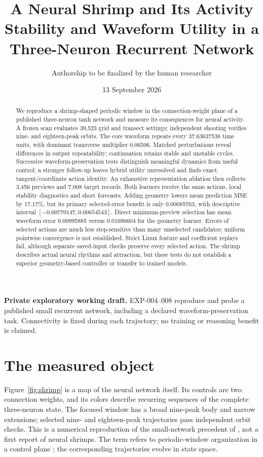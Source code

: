 \documentclass[11pt,letterpaper]{article}
\title{A Neural Shrimp and Its Activity\\
\large Stability and Waveform Utility in a Three-Neuron Recurrent Network}
\author{Authorship to be finalized by the human researcher}
\date{13 September 2026}
\begin{document}
\maketitle
\noindent\textbf{Private exploratory working draft.} EXP-004--008 reproduce and probe a published small recurrent network, including a declared waveform-preservation task. Connectivity is fixed during each trajectory; no training or reasoning benefit is claimed.

\begin{abstract}
We reproduce a shrimp-shaped periodic window in the connection-weight plane of a published three-neuron tanh network and measure its consequences for neural activity. A frozen scan evaluates 39,523 grid and transect settings; independent shooting verifies nine- and eighteen-peak orbits. The core waveform repeats every 37.63637538 time units, with dominant transverse multiplier 0.06506. Matched perturbations reveal differences in output repeatability; continuation retains stable and unstable cycles. Successive waveform-preservation tests distinguish meaningful dynamics from useful control: a stronger follow-up leaves hybrid utility unresolved and finds exact tangent/coordinate action identity. An exhaustive representation ablation then collects 3,456 previews and 7,008 target records. Both learners receive the same actions, local stability diagnostics and short forecasts. Adding geometry lowers mean prediction MSE by 17.17\%, but its primary selected-error benefit is only 0.00085763, with descriptive interval $[-0.00770147,0.00654543]$. Direct minimum-preview selection has mean waveform error 0.00995885 versus 0.01696604 for the geometry learner. Errors of selected actions are much less step-sensitive than many unselected candidates; uniform pointwise convergence is not established. Strict Linux feature and coefficient replays fail, although separate saved-input checks preserve every selected action. The shrimp describes actual neural rhythms and attraction, but these tests do not establish a superior geometry-based controller or transfer to trained models.
\end{abstract}

\section{The measured object}
Figure~\ref{fig:shrimp} is a map of the neural network itself. Its controls are two connection weights, and its colors describe recurring sequences of the complete three-neuron state. The focused window has a broad nine-peak body and narrow extensions; selected nine- and eighteen-peak trajectories pass independent orbit checks. This is a numerical reproduction of the small-network precedent of \citet{dasilva2022}, not a first report of neural shrimps. The term refers to periodic-window organization in a control plane \citep{gallas1993}; the corresponding trajectories evolve in state space.
\end{document}
